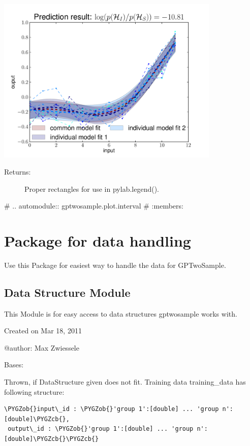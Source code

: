\documentclass[letterpaper,10pt,english]{sphinxmanual}
\def\PYGZob{\char`\{}
\def\PYGZcb{\char`\}}
\begin{document}
\begin{fulllineitems}
\includegraphics[height=8cm]{plotGPTwoSampleSame.pdf}
\begin{description}
\item[{Returns:}] \leavevmode
Proper rectangles for use in pylab.legend().

\end{description}

\end{fulllineitems}


\#  .. automodule:: gptwosample.plot.interval
\#    :members:
\label{data:module-gptwosample.data}

\section{Package for data handling}
\label{data:package-for-data-handling}\label{data::doc}
Use this Package for easiest way to handle the data for GPTwoSample.
\label{data:module-gptwosample.data.data_base}

\subsection{Data Structure Module}
\label{data:data-structure-module}
This Module is for easy access to data structures gptwosample works with.

Created on Mar 18, 2011

@author: Max Zwiessele

\begin{fulllineitems}
\label{data:gptwosample.data.data_base.DataStructureError}
Bases: 

Thrown, if DataStructure given does not fit.
Training data training\_data has following structure:

\begin{Verbatim}[commandchars=\\\{\}]
\PYGZob{}input\_id : \PYGZob{}'group 1':[double] ... 'group n':[double]\PYGZcb{},
 output\_id : \PYGZob{}'group 1':[double] ... 'group n':[double]\PYGZcb{}\PYGZcb{}
\end{Verbatim}

\end{fulllineitems}
\end{document}
